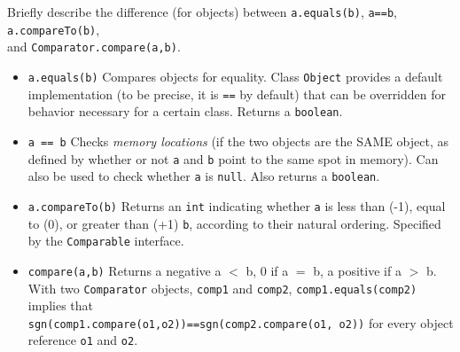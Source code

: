 Briefly describe the difference (for objects) between \texttt{a.equals(b)}, \texttt{a==b}, \texttt{a.compareTo(b)},\\ and \texttt{Comparator.compare(a,b)}.

\begin{answer}
\begin{itemize}

\item \texttt{a.equals(b)} Compares objects for equality. 
Class \texttt{Object} provides a default implementation (to be precise, it is \texttt{==} by default) that can be overridden for behavior necessary for a certain class. Returns a \texttt{boolean}.

\item \texttt{a == b}  Checks \textit{memory locations} (if the two objects are the SAME object, as defined by whether or not \texttt{a} and \texttt{b} point to the same spot in memory). Can also be used to check whether \texttt{a} is \texttt{null}. Also returns a \texttt{boolean}.

\item \texttt{a.compareTo(b)} Returns an \texttt{int} indicating whether \texttt{a} is less than (-1),
equal to (0), or greater than (+1) \texttt{b}, according to their natural ordering. Specified by the \texttt{Comparable} interface.

\item \texttt{compare(a,b)} Returns a negative a $<$ b, 0 if a $=$ b, a positive if a $>$ b. \\
With two \texttt{Comparator} objects, \texttt{comp1} and \texttt{comp2},
\texttt{comp1.equals(comp2)} implies that \\ \texttt{sgn(comp1.compare(o1,o2))==sgn(comp2.compare(o1, o2))} for every object reference \texttt{o1} and \texttt{o2}.

\end{itemize}
\end{answer}
